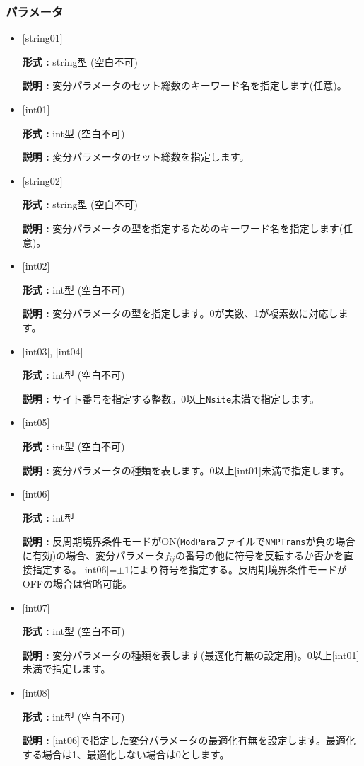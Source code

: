 \subsubsection{パラメータ}
 \begin{itemize}

   \item  $[$string01$]$
   
    {\bf 形式 :} string型 (空白不可)

   {\bf 説明 :} 変分パラメータのセット総数のキーワード名を指定します(任意)。

   \item  $[$int01$]$
   
    {\bf 形式 :} int型 (空白不可)

   {\bf 説明 :} 変分パラメータのセット総数を指定します。

   \item  $[$string02$]$
   
    {\bf 形式 :} string型 (空白不可)

   {\bf 説明 :} 変分パラメータの型を指定するためのキーワード名を指定します(任意)。

   \item  $[$int02$]$
   
    {\bf 形式 :} int型 (空白不可)

   {\bf 説明 :} 変分パラメータの型を指定します。0が実数、1が複素数に対応します。

  \item  $[$int03$]$, $[$int04$]$
   
 {\bf 形式 :} int型 (空白不可)

{\bf 説明 :} サイト番号を指定する整数。0以上\verb|Nsite|{未満}で指定します。
 
 \item  $[$int05$]$
   
   {\bf 形式 :} int型 (空白不可)

  {\bf 説明 :} 変分パラメータの種類を表します。0以上[int01]{未満}で指定します。

 \item  $[$int06$]$
   
   {\bf 形式 :} int型

  {\bf 説明 :} 反周期境界条件モードがON(\verb|ModPara|ファイルで\verb|NMPTrans|が負の場合に有効)の場合、変分パラメータ$f_{ij}$の番号の他に符号を反転するか否かを直接指定する。$[$int06$]$=$\pm1$により符号を指定する。反周期境界条件モードがOFFの場合は省略可能。


 \item  $[$int07$]$
   
   {\bf 形式 :} int型 (空白不可)

  {\bf 説明 :} 変分パラメータの種類を表します(最適化有無の設定用)。0以上[int01]{未満}で指定します。
  
 \item  $[$int08$]$
   
   {\bf 形式 :} int型 (空白不可)

  {\bf 説明 :} [int06]で指定した変分パラメータの最適化有無を設定します。最適化する場合は1、最適化しない場合は0とします。
  
  
\end{itemize}

